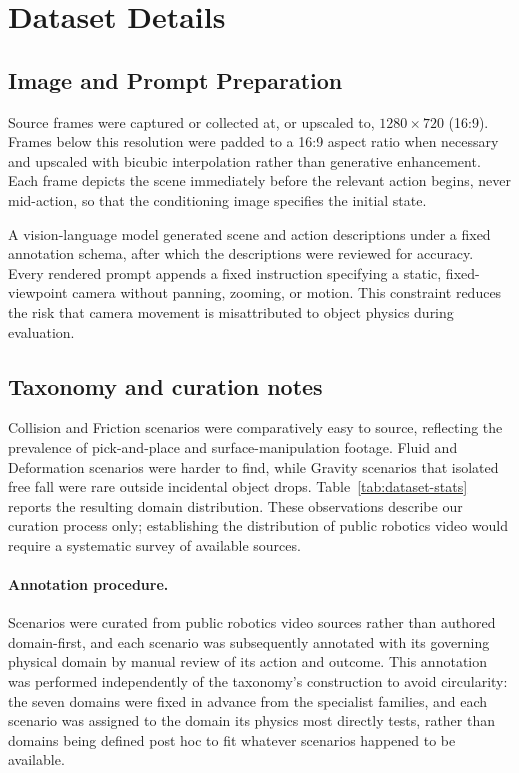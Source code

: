 \section{Dataset Details}
\label{app:dataset-details}

\subsection{Image and Prompt Preparation}
Source frames were captured or collected at, or upscaled to, $1280\times720$ (16:9). Frames below this resolution were padded to a 16:9 aspect ratio when necessary and upscaled with bicubic interpolation rather than generative enhancement. Each frame depicts the scene immediately before the relevant action begins, never mid-action, so that the conditioning image specifies the initial state.

A vision-language model generated scene and action descriptions under a fixed annotation schema, after which the descriptions were reviewed for accuracy. Every rendered prompt appends a fixed instruction specifying a static, fixed-viewpoint camera without panning, zooming, or motion. This constraint reduces the risk that camera movement is misattributed to object physics during evaluation.

\subsection{Taxonomy and curation notes}
Collision and Friction scenarios were comparatively easy to source, reflecting the prevalence of pick-and-place and surface-manipulation footage. Fluid and Deformation scenarios were harder to find, while Gravity scenarios that isolated free fall were rare outside incidental object drops. Table~\ref{tab:dataset-stats} reports the resulting domain distribution. These observations describe our curation process only; establishing the distribution of public robotics video would require a systematic survey of available sources.

\paragraph{Annotation procedure.} Scenarios were curated from public robotics video sources rather than authored domain-first, and each scenario was subsequently annotated with its governing physical domain by manual review of its action and outcome. This annotation was performed independently of the taxonomy's construction to avoid circularity: the seven domains were fixed in advance from the specialist families, and each scenario was assigned to the domain its physics most directly tests, rather than domains being defined post hoc to fit whatever scenarios happened to be available.

